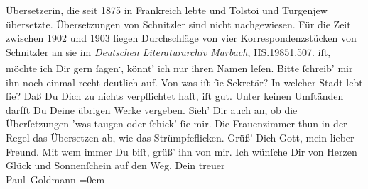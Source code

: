 \begin{ledgroupsized}[t]{13cm}
{{{                  Übersetzerin, die seit 1875 in Frankreich lebte und Tolstoi und
                     Turgenjew übersetzte. Übersetzungen von
                     Schnitzler sind nicht nachgewiesen. Für
                  die Zeit zwischen 1902 und 1903
                  liegen Durchschläge von vier Korrespondenzstücken von Schnitzler an sie  im \emph{Deutschen Literaturarchiv Marbach},
                  HS.19851.507.}}}\label{K_L02739-4h} iſt, möchte ich Dir gern ſagen\substVorne{}\textsuperscript{.}\substDazwischen{},\substHinten{} könnt’ ich nur ihren Namen leſen. Bitte ſchreib’ mir ihn noch einmal recht
               deutlich auf. Von was iſt ſie Sekretär? In welcher Stadt lebt ſie? Daß Du Dich zu nichts verpflichtet
               haſt, iſt gut. Unter keinen Umſtänden {\pb}darfſt Du
               Deine übrigen Werke vergeben. Sieh’ Dir auch an, ob die Überſetzungen ’was taugen
               oder ſchick’ ſie mir. Die Frauenzimmer thun in der Regel das Übersetzen ab, wie das
               Strümpfeflicken.\pend
           \pstart
           Grüß’ Dich Gott, mein lieber Freund. Mit wem immer Du biſt, grüß’ ihn von mir. Ich
               wünſche Dir von Herzen Glück und Sonnenſchein auf den Weg.\pend
           \pstart
           Dein treuer {\\[\baselineskip]}\spacefill\mbox{Paul Goldmann}\pend
           \leftskip=0em{}
         
         \endnumbering{}\end{ledgroupsized}  \newcommand{\dateiname}{L02739}\newcommand{\titel}{Paul Goldmann an Arthur Schnitzler, 6. 7. [1895]}\newcommand{\editorInnen}{Martin Anton Müller und Laura Untner}
      